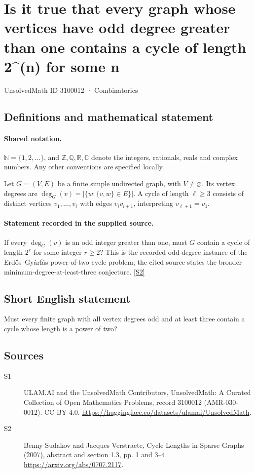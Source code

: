 \documentclass[11pt]{article}
\newcommand{\sref}[2]{\hyperlink{source:#1:#2}{[S#2]}}
\begin{document}
\setcounter{section}{3100011}
\section{Is it true that every graph whose vertices have odd degree greater than one contains a cycle of length 2\textasciicircum{}(n) for some n}\label{3100012}
{\small\sffamily UnsolvedMath ID 3100012 · Combinatorics}
\subsection{Definitions and mathematical statement}

\paragraph{Shared notation.}$\mathbb N=\{1,2,\ldots\}$, and $\mathbb Z,\mathbb Q,\mathbb R,\mathbb C$ denote the integers, rationals, reals and complex numbers. Any other conventions are specified locally.


Let $G=(V,E)$ be a finite simple undirected graph, with $V\ne\varnothing$. Its vertex degrees are $\deg_G(v)=|\{w:\{v,w\}\in E\}|$. A cycle of length $\ell\geq3$ consists of distinct vertices $v_1,\ldots,v_\ell$ with edges $v_iv_{i+1}$, interpreting $v_{\ell+1}=v_1$.
\paragraph{Statement recorded in the supplied source.}
If every $\deg_G(v)$ is an odd integer greater than one, must $G$ contain a cycle of length $2^r$ for some integer $r\geq2$? This is the recorded odd-degree instance of the Erd\H{o}s--Gy\'arf\'as power-of-two cycle problem; the cited source states the broader minimum-degree-at-least-three conjecture. \sref{3100012}{2}
\subsection{Short English statement}
Must every finite graph with all vertex degrees odd and at least three contain a cycle whose length is a power of two?
\subsection{Sources}
\begin{description}
\item[\hypertarget{source:3100012:1}{S1}] ULAM.AI and the UnsolvedMath Contributors, UnsolvedMath: A Curated Collection of Open Mathematics Problems, record 3100012 (AMR-030-0012). CC BY 4.0. \url{https://huggingface.co/datasets/ulamai/UnsolvedMath}.
\item[\hypertarget{source:3100012:2}{S2}] Benny Sudakov and Jacques Verstraete, Cycle Lengths in Sparse Graphs (2007), abstract and section 1.3, pp. 1 and 3--4. \url{https://arxiv.org/abs/0707.2117}.
\end{description}
\label{end:3100012}
\end{document}
